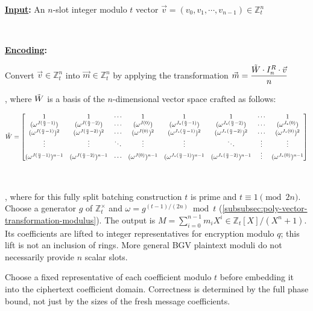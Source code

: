 \begin{tcolorbox}[title={\textbf{\tboxlabel{\ref*{subsec:bgv-encoding-decoding}} BGV's Encoding and Decoding}}]



\textbf{\underline{Input}:} An $n$-slot integer modulo $t$ vector $\vec{v} = (v_0, v_1, \cdots, v_{n-1}) \in \mathbb{Z}_t^n$

$ $

\textbf{\underline{Encoding}:}

 Convert $\vec{v} \in \mathbb{Z}_t^n$ into $\vec{m} \in \mathbb{Z}_t^n$ by applying the transformation $\vec{m} = \dfrac{\tilde W \cdot I_n^R \cdot \vec{v}}{n}$

, where $\tilde W$ is a basis of the $n$-dimensional vector space crafted as follows:

{\footnotesize{$\tilde W = \begin{bmatrix}
1 & 1 & \cdots & 1 & 1 & 1 & \cdots & 1\\
(\omega^{J(\frac{n}{2} - 1)}) & (\omega^{J(\frac{n}{2} - 2)}) & \cdots & (\omega^{J(0)}) & (\omega^{J_*(\frac{n}{2} - 1)}) & (\omega^{J_*(\frac{n}{2} - 2)}) & \cdots & (\omega^{J_*(0)})\\
(\omega^{J(\frac{n}{2} - 1)})^2 & (\omega^{J(\frac{n}{2} - 2)})^2 & \cdots & (\omega^{J(0)})^2 & (\omega^{J_*(\frac{n}{2} - 1)})^2 & (\omega^{J_*(\frac{n}{2} - 2)})^2 & \cdots & (\omega^{J_*(0)})^2 \\
\vdots & \vdots & \ddots & \vdots & \vdots & \ddots & \vdots & \vdots \\
(\omega^{J(\frac{n}{2} - 1)})^{n-1} & (\omega^{J(\frac{n}{2} - 2)})^{n-1} & \cdots & (\omega^{J(0)})^{n-1} & (\omega^{J_*(\frac{n}{2} - 1)})^{n-1} & (\omega^{J_*(\frac{n}{2} - 2)})^{n-1} & \vdots  & (\omega^{J_*(0)})^{n-1}
\end{bmatrix}$}}

$ $

, where for this fully split batching construction $t$ is prime and $t\equiv1\pmod{2n}$. Choose a generator $g$ of $\mathbb{Z}_t^\times$ and $\omega=g^{(t-1)/(2n)}\bmod t$ (\autoref{subsubsec:poly-vector-transformation-modulus}). The output is $M=\sum_{i=0}^{n-1}m_iX^i\in\mathbb{Z}_t[X]/(X^n+1)$. Its coefficients are lifted to integer representatives for encryption modulo $q$; this lift is not an inclusion of rings. More general BGV plaintext moduli do not necessarily provide $n$ scalar slots.

Choose a fixed representative of each coefficient modulo $t$ before embedding it into the ciphertext coefficient domain. Correctness is determined by the full phase bound, not just by the sizes of the fresh message coefficients.


\end{tcolorbox}
